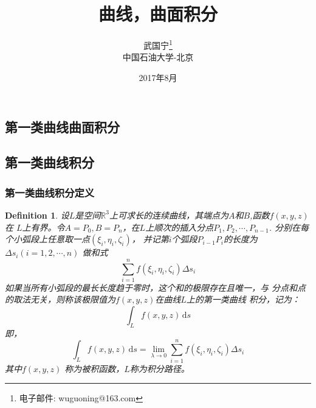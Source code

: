 \documentclass[a4paper,12pt]{article}
\newtheorem{definition}{Definition}
\begin{document}
\begin{CJK}{UTF8}{gbsn}
\title{曲线，曲面积分}
\author{武国宁\footnote{电子邮件: wuguoning@163.com}\\[2ex]
 中国石油大学-北京\\[2ex]}
\date{2017年8月}
\maketitle

\section{第一类曲线曲面积分}
\subsection{第一类曲线积分}
    \subsubsection{第一类曲线积分定义}
\begin{definition}
    设$L$是空间$\mathbb{R}^3$上可求长的连续曲线，其端点为$A$和$B$,函数$f(x,y,z)$在
    $L$上有界。令$A = P_0, B = P_n$，在$L$上顺次的插入分点$P_1,P_2, \cdots, P_{n-1}$.
    分别在每个小弧段上任意取一点$\left(\xi_i,\eta_i,\zeta_i\right)$，
    并记第$i$个弧段$P_{i-1}P_i$的长度为$\Delta s_i(i=1,2,\cdots,n)$
    做和式
    \[
        \sum_{i=1}^{n}f(\xi_i,\eta_i,\zeta_i)\Delta s_i
    \]
    如果当所有小弧段的最长长度趋于零时，这个和的极限存在且唯一，与
    分点和点的取法无关，则称该极限值为$f(x,y,z)$在曲线$L$上的第一类曲线
    积分，记为：
    \[
        \int_{L} f(x,y,z)\,\mathrm{d}s
    \]
    即，
    \[
        \int_{L} f(x,y,z)\,\mathrm{d}s = \lim_{\lambda \to 0}\sum_{i=1}^{n}f(\xi_i,\eta_i,\zeta_i)\Delta s_i
    \]
    其中$f(x,y,z)$ 称为被积函数，$L$称为积分路径。
\end{definition}


\end{CJK}
\end{document}

